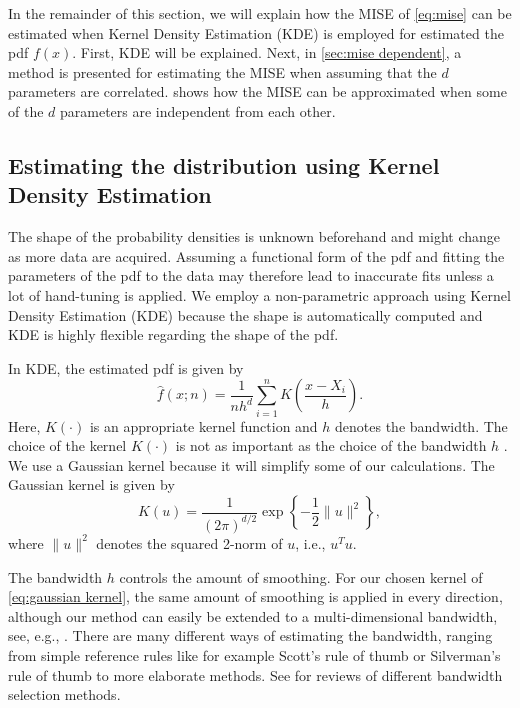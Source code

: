 In the remainder of this section, we will explain how the MISE of \cref{eq:mise} can be estimated when Kernel Density Estimation (KDE) is employed for estimated the pdf $f(x)$. First, KDE will be explained. Next, in \cref{sec:mise dependent}, a method is presented for estimating the MISE when assuming that the $d$ parameters are correlated.  shows how the MISE can be approximated when some of the $d$ parameters are independent from each other.

\subsection{Estimating the distribution using Kernel Density Estimation}
\label{sec:kde}

The shape of the probability densities is unknown beforehand and might change as more data are acquired. Assuming a functional form of the pdf and fitting the parameters of the pdf to the data may therefore lead to inaccurate fits unless a lot of hand-tuning is applied. We employ a non-parametric approach using Kernel Density Estimation (KDE) \cite{rosenblatt1956remarks, parzen1962estimation} because the shape is automatically computed and KDE is highly flexible regarding the shape of the pdf.

In KDE, the estimated pdf is given by
\begin{equation}
	\label{eq:kde}
	\hat{f}(x;n) = \frac{1}{nh^d} \sum_{i=1}^n K\left(\frac{x - X_i}{h}\right).
\end{equation}
Here, $K(\cdot)$ is an appropriate kernel function and $h$ denotes the bandwidth. The choice of the kernel $K(\cdot)$ is not as important as the choice of the bandwidth $h$ \cite{turlach1993bandwidthselection}. We use a Gaussian kernel because it will simplify some of our calculations. The Gaussian kernel is given by
\begin{equation}
	\label{eq:gaussian kernel}
	K(u) = \frac{1}{\left( 2\pi \right)^{d/2}} \exp \left\{ -\frac{1}{2} \|u\|^2 \right\},
\end{equation}
where $\|u\|^2$ denotes the squared 2-norm of $u$, i.e., $u^T u$.

The bandwidth $h$ controls the amount of smoothing. For our chosen kernel of \cref{eq:gaussian kernel}, the same amount of smoothing is applied in every direction, although our method can easily be extended to a multi-dimensional bandwidth, see, e.g., \textcite{scott2005multidimensional, chen2017tutorial}. There are many different ways of estimating the bandwidth, ranging from simple reference rules like for example Scott's rule of thumb \cite{scott2015multivariate} or Silverman's rule of thumb \cite{silverman1986density} to more elaborate methods. See \textcite{turlach1993bandwidthselection, bashtannyk2001bandwidth, jones1996brief, chiu1996comparative} for reviews of different bandwidth selection methods. 

